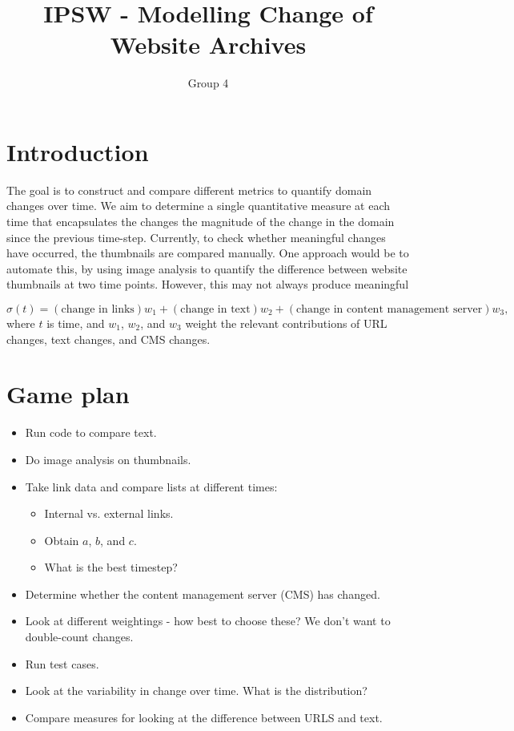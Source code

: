 \documentclass[10pt, a4paper]{article}
\begin{document}
\title{IPSW - Modelling Change of Website Archives}
\author{Group 4}
\date{\vspace{-5ex}}
\maketitle

\section{Introduction}

The goal is to construct and compare different metrics to quantify domain changes over time.  We aim to determine a single quantitative measure at each time that encapsulates the changes the magnitude of the change in the domain since the previous time-step. Currently, to check whether meaningful changes have occurred, the thumbnails are compared manually. One approach would be to automate this, by using image analysis to quantify the difference between website thumbnails at two time points. However, this may not always produce meaningful 


\begin{equation}
\sigma(t) = (\text{change in links})w_1 + (\text{change in text})w_2 + (\text{change in content management server})w_3,
\end{equation}
where $t$ is time, and $w_1$, $w_2$, and $w_3$ weight the relevant contributions of URL changes, text changes, and CMS changes.


\section{Game plan}
\begin{itemize}
\item Run code to compare text.
\item Do image analysis on thumbnails.
\item Take link data and compare lists at different times:
\begin{itemize}
\item Internal vs. external links.
\item Obtain $a$, $b$, and $c$. 
\item What is the best timestep?
\end{itemize}
\item Determine whether the content management server (CMS) has changed.
\item Look at different weightings - how best to choose these? We don't want to double-count changes.
\item Run test cases.
\item Look at the variability in change over time. What is the distribution?
\item Compare measures for looking at the difference between URLS and text.
\end{itemize}
\end{document}
